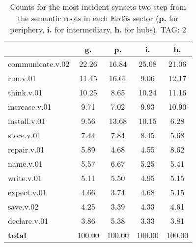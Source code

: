 \begin{table}[h!]
\begin{center}
\begin{tabular}{| l || c | c | c | c |}\hline
 & {\bf g.} & {\bf p.} & {\bf i.} & {\bf h.} \\\hline\hline
communicate.v.02 & 22.26  & 16.84  & 25.08  & 21.06 \\\hline
run.v.01 & 11.45  & 16.61  & 9.06  & 12.17 \\\hline
think.v.01 & 10.25  & 8.65  & 10.24  & 11.16 \\\hline
increase.v.01 & 9.71  & 7.02  & 9.93  & 10.90 \\\hline
install.v.01 & 9.56  & 13.68  & 10.15  & 6.28 \\\hline
store.v.01 & 7.44  & 7.84  & 8.45  & 5.68 \\\hline
repair.v.01 & 5.89  & 4.68  & 4.55  & 8.62 \\\hline
name.v.01 & 5.57  & 6.67  & 5.25  & 5.41 \\\hline
write.v.01 & 5.11  & 5.50  & 4.95  & 5.15 \\\hline
expect.v.01 & 4.66  & 3.74  & 4.68  & 5.15 \\\hline
save.v.02 & 4.25  & 3.39  & 4.33  & 4.61 \\\hline
declare.v.01 & 3.86  & 5.38  & 3.33  & 3.81 \\\hline\hline
{{\bf total}} & 100.00  & 100.00  & 100.00  & 100.00 \\\hline
\end{tabular}
\caption{Counts for the most incident synsets two step from the semantic roots in each Erd\"os sector ({\bf p.} for periphery, {\bf i.} for intermediary, {\bf h.} for hubs). TAG: 2}
\end{center}
\end{table}